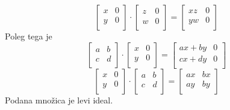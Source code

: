 \documentclass[11pt, a4paper]{article}
\begin{document}
\begin{example}
        \[
            \begin{bmatrix}
                x & 0 \\
                y & 0 \\
            \end{bmatrix}
            \cdot
            \begin{bmatrix}
                z & 0 \\
                w & 0 \\
            \end{bmatrix}
            =
            \begin{bmatrix}
                xz & 0 \\
                yw & 0 \\
            \end{bmatrix}
        \]
        Poleg tega je
        \[
            \begin{bmatrix}
                a & b \\
                c & d \\
            \end{bmatrix}
            \cdot
            \begin{bmatrix}
                x & 0 \\
                y & 0 \\
            \end{bmatrix}
            =
            \begin{bmatrix}
                ax + by & 0 \\
                cx + dy & 0 \\
            \end{bmatrix}
        \]
        \[
            \begin{bmatrix}
                x & 0 \\
                y & 0 \\
            \end{bmatrix}
            \cdot
            \begin{bmatrix}
                a & b \\
                c & d \\
            \end{bmatrix}
            =
            \begin{bmatrix}
                ax & bx \\
                ay & by \\
            \end{bmatrix}
        \]
        Podana množica je levi ideal. 
    \end{example}
\end{document}
